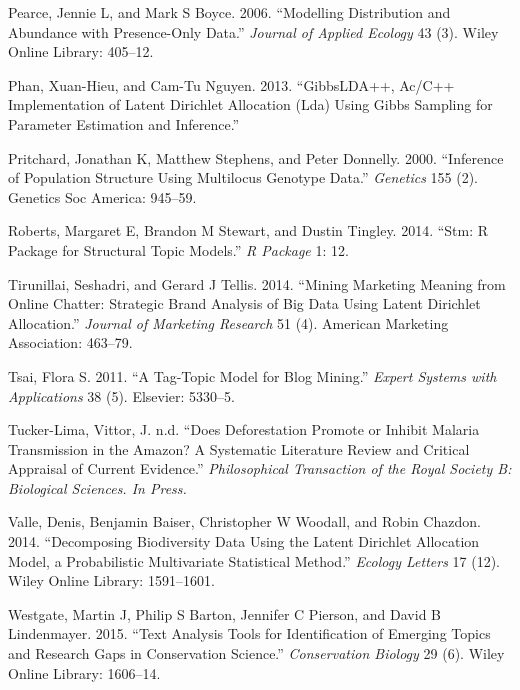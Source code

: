 \documentclass[article]{jss}
\begin{document}
\hypertarget{ref-pearce2006modelling}{}
Pearce, Jennie L, and Mark S Boyce. 2006. ``Modelling Distribution and
Abundance with Presence-Only Data.'' \emph{Journal of Applied Ecology}
43 (3). Wiley Online Library: 405--12.

\hypertarget{ref-phan2013gibbslda}{}
Phan, Xuan-Hieu, and Cam-Tu Nguyen. 2013. ``GibbsLDA++, Ac/C++
Implementation of Latent Dirichlet Allocation (Lda) Using Gibbs Sampling
for Parameter Estimation and Inference.''

\hypertarget{ref-pritchard2000inference}{}
Pritchard, Jonathan K, Matthew Stephens, and Peter Donnelly. 2000.
``Inference of Population Structure Using Multilocus Genotype Data.''
\emph{Genetics} 155 (2). Genetics Soc America: 945--59.

\hypertarget{ref-roberts2014stm}{}
Roberts, Margaret E, Brandon M Stewart, and Dustin Tingley. 2014. ``Stm:
R Package for Structural Topic Models.'' \emph{R Package} 1: 12.

\hypertarget{ref-tirunillai2014mining}{}
Tirunillai, Seshadri, and Gerard J Tellis. 2014. ``Mining Marketing
Meaning from Online Chatter: Strategic Brand Analysis of Big Data Using
Latent Dirichlet Allocation.'' \emph{Journal of Marketing Research} 51
(4). American Marketing Association: 463--79.

\hypertarget{ref-tsai2011tag}{}
Tsai, Flora S. 2011. ``A Tag-Topic Model for Blog Mining.'' \emph{Expert
Systems with Applications} 38 (5). Elsevier: 5330--5.

\hypertarget{ref-dennis}{}
Tucker-Lima, Vittor, J. n.d. ``Does Deforestation Promote or Inhibit
Malaria Transmission in the Amazon? A Systematic Literature Review and
Critical Appraisal of Current Evidence.'' \emph{Philosophical
Transaction of the Royal Society B: Biological Sciences. In Press.}

\hypertarget{ref-valle2014decomposing}{}
Valle, Denis, Benjamin Baiser, Christopher W Woodall, and Robin Chazdon.
2014. ``Decomposing Biodiversity Data Using the Latent Dirichlet
Allocation Model, a Probabilistic Multivariate Statistical Method.''
\emph{Ecology Letters} 17 (12). Wiley Online Library: 1591--1601.

\hypertarget{ref-westgate2015text}{}
Westgate, Martin J, Philip S Barton, Jennifer C Pierson, and David B
Lindenmayer. 2015. ``Text Analysis Tools for Identification of Emerging
Topics and Research Gaps in Conservation Science.'' \emph{Conservation
Biology} 29 (6). Wiley Online Library: 1606--14.
\end{document}
